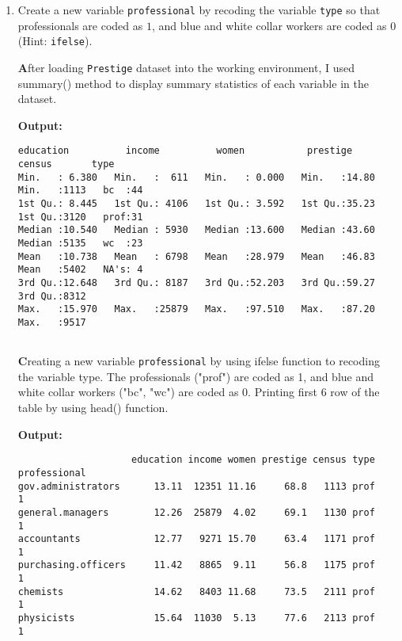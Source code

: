 \documentclass[12pt,letterpaper]{article}
\begin{document}
\newpage
\begin{enumerate}
	
	\item [(a)]
	Create a new variable \texttt{professional} by recoding the variable \texttt{type} so that professionals are coded as $1$, and blue and white collar workers are coded as $0$ (Hint: \texttt{ifelse}).
	
	\noindent \textbf After loading \texttt{Prestige} dataset into the working environment, I used summary() method to display summary statistics of each variable in the dataset. \vspace{0.5cm}
		
		  
	\vspace{.25cm} 
		\noindent \textbf{Output: }
		\begin{footnotesize}
		\begin{verbatim}
education          income          women           prestige         census       type    
Min.   : 6.380   Min.   :  611   Min.   : 0.000   Min.   :14.80   Min.   :1113   bc  :44   
1st Qu.: 8.445   1st Qu.: 4106   1st Qu.: 3.592   1st Qu.:35.23   1st Qu.:3120   prof:31   
Median :10.540   Median : 5930   Median :13.600   Median :43.60   Median :5135   wc  :23   
Mean   :10.738   Mean   : 6798   Mean   :28.979   Mean   :46.83   Mean   :5402   NA's: 4   
3rd Qu.:12.648   3rd Qu.: 8187   3rd Qu.:52.203   3rd Qu.:59.27   3rd Qu.:8312             
Max.   :15.970   Max.   :25879   Max.   :97.510   Max.   :87.20   Max.   :9517            
			
		\end{verbatim}  
	\end{footnotesize}
	
	\noindent \textbf  Creating a new variable \texttt{professional} by using ifelse function to recoding the variable type. The professionals ("prof") are coded as 1, and blue and white collar workers ("bc", "wc") are coded as 0. Printing first 6 row of the table by using head() function. \vspace{0.5cm}
	

	  
	\vspace{.25cm}
	
	\noindent \textbf{Output: }
	\begin{footnotesize}
		\begin{verbatim}
                    education income women prestige census type   professional
gov.administrators      13.11  12351 11.16     68.8   1113 prof            1
general.managers        12.26  25879  4.02     69.1   1130 prof            1
accountants             12.77   9271 15.70     63.4   1171 prof            1
purchasing.officers     11.42   8865  9.11     56.8   1175 prof            1
chemists                14.62   8403 11.68     73.5   2111 prof            1
physicists              15.64  11030  5.13     77.6   2113 prof            1
			

\end{verbatim}
\end{footnotesize}
\end{enumerate}
\end{document}
